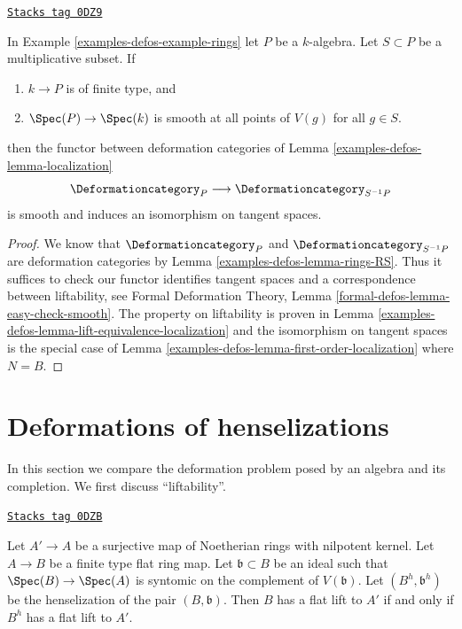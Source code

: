 \begin{lemma}
\label{examples-defos-lemma-smooth-localization}
\href{https://stacks.math.columbia.edu/tag/0DZ9}{\texttt{Stacks tag 0DZ9}}

In Example \ref{examples-defos-example-rings} let $P$ be a $k$-algebra.
Let $S \subset P$ be a multiplicative subset. If
\begin{enumerate}
\item $k \to P$ is of finite type, and
\item $\Spec(P) \to \Spec(k)$ is smooth at all points of
$V(g)$ for all $g \in S$.
\end{enumerate}
then the functor between deformation categories of
Lemma \ref{examples-defos-lemma-localization}
$$
\Deformationcategory_P \longrightarrow \Deformationcategory_{S^{-1}P}
$$
is smooth and induces an isomorphism on tangent spaces.
\end{lemma}

\begin{proof}
We know that $\Deformationcategory_P$ and $\Deformationcategory_{S^{-1}P}$
are deformation categories by Lemma \ref{examples-defos-lemma-rings-RS}.
Thus it suffices to check
our functor identifies tangent spaces and a correspondence
between liftability, see
Formal Deformation Theory, Lemma \ref{formal-defos-lemma-easy-check-smooth}.
The property on liftability is proven in
Lemma \ref{examples-defos-lemma-lift-equivalence-localization}
and the isomorphism on tangent spaces is the special case of
Lemma \ref{examples-defos-lemma-first-order-localization} where $N = B$.
\end{proof}

\section{Deformations of henselizations}
\label{examples-defos-section-compare-henselization}
In this section we compare the deformation problem posed
by an algebra and its completion.
We first discuss ``liftability''.

\begin{lemma}
\label{examples-defos-lemma-lift-equivalence-henselization}
\href{https://stacks.math.columbia.edu/tag/0DZB}{\texttt{Stacks tag 0DZB}}

Let $A' \to A$ be a surjective map of Noetherian rings with nilpotent kernel.
Let $A \to B$ be a finite type flat ring map.
Let $\mathfrak b \subset B$ be an ideal such that
$\Spec(B) \to \Spec(A)$ is syntomic on the complement of $V(\mathfrak b)$.
Let $(B^h, \mathfrak b^h)$ be the henselization of the pair $(B, \mathfrak b)$.
Then $B$ has a flat lift to $A'$ if and only if $B^h$ has a flat lift to $A'$.
\end{lemma}

